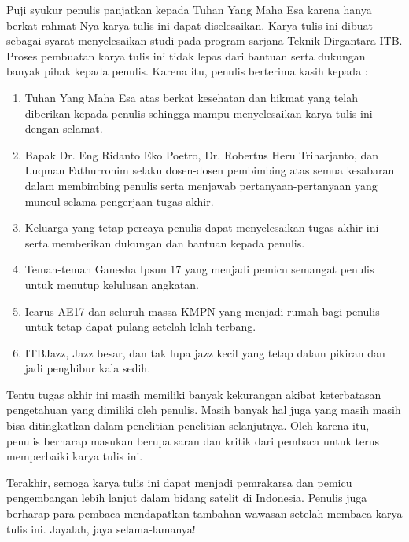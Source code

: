 Puji syukur penulis panjatkan kepada Tuhan Yang Maha Esa karena hanya berkat
rahmat-Nya karya tulis ini dapat diselesaikan. Karya tulis ini dibuat sebagai
syarat menyelesaikan studi pada program sarjana Teknik Dirgantara ITB. Proses
pembuatan karya tulis ini tidak lepas dari bantuan serta dukungan banyak pihak
kepada penulis. Karena itu, penulis berterima kasih kepada :

\begin{enumerate}
\item Tuhan Yang Maha Esa atas berkat kesehatan dan hikmat yang telah diberikan kepada penulis sehingga mampu menyelesaikan karya tulis ini dengan selamat.
\item Bapak Dr. Eng Ridanto Eko Poetro, Dr. Robertus Heru Triharjanto, dan Luqman Fathurrohim selaku dosen-dosen pembimbing atas semua kesabaran dalam membimbing penulis serta menjawab pertanyaan-pertanyaan yang muncul selama pengerjaan tugas akhir.
\item Keluarga yang tetap percaya penulis dapat menyelesaikan tugas akhir ini serta memberikan dukungan dan bantuan kepada penulis.
\item Teman-teman Ganesha Ipsun 17 yang menjadi pemicu semangat penulis untuk menutup kelulusan angkatan. 
\item Icarus AE17 dan seluruh massa KMPN yang menjadi rumah bagi penulis untuk tetap dapat pulang setelah lelah terbang.
\item ITBJazz, Jazz besar, dan tak lupa jazz kecil yang tetap dalam pikiran dan jadi penghibur kala sedih.
\end{enumerate}

Tentu tugas akhir ini masih memiliki banyak kekurangan akibat keterbatasan
pengetahuan yang dimiliki oleh penulis. Masih banyak hal juga yang masih masih
bisa ditingkatkan dalam penelitian-penelitian selanjutnya. Oleh karena itu,
penulis berharap masukan berupa saran dan kritik dari pembaca untuk terus
memperbaiki karya tulis ini.

Terakhir, semoga karya tulis ini dapat menjadi pemrakarsa dan pemicu
pengembangan lebih lanjut dalam bidang satelit di Indonesia. Penulis juga
berharap para pembaca mendapatkan tambahan wawasan setelah membaca karya tulis
ini. Jayalah, jaya selama-lamanya!
